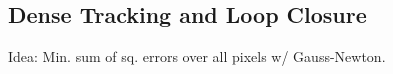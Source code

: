 \subsection{Dense Tracking and Loop Closure}
Idea: Min. sum of sq. errors over all pixels w/ Gauss-Newton.
